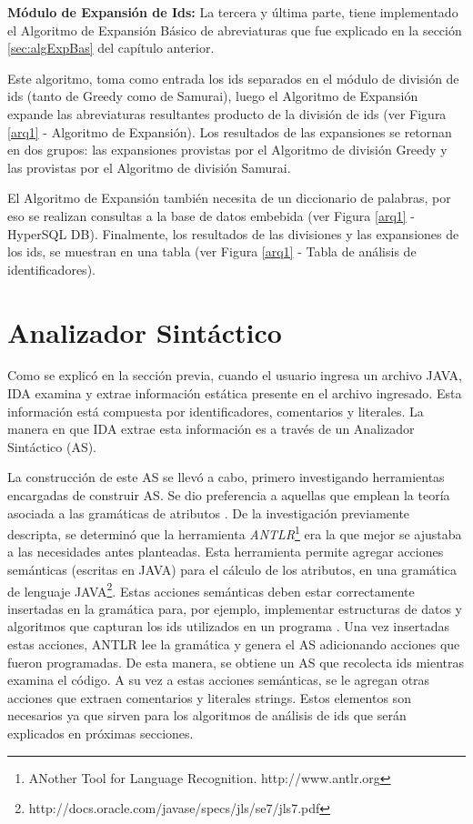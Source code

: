 \textbf{Módulo de Expansión de Ids:} La tercera y última parte, tiene implementado el Algoritmo de Expansión Básico de abreviaturas que fue explicado en la sección \ref{sec:algExpBas} del capítulo anterior. 

Este algoritmo, toma como entrada los ids separados en el módulo de división de ids (tanto de Greedy como de Samurai), luego el Algoritmo de Expansión expande las abreviaturas resultantes producto de la división de ids (ver Figura \ref{arq1} - Algoritmo de Expansión). Los resultados de las expansiones se retornan en dos grupos: las expansiones provistas por el Algoritmo de división Greedy y las provistas por el Algoritmo de división Samurai.


El \mbox{Algoritmo} de Expansión también necesita de un diccionario de palabras, por eso se realizan consultas a la base de datos embebida (ver Figura \ref{arq1} - HyperSQL DB). Finalmente, los resultados de las divisiones y las expansiones de los ids, se muestran en una tabla (ver Figura \ref{arq1} - Tabla de análisis de identificadores).

\section{Analizador Sintáctico}

Como se explicó en la sección previa, cuando el usuario ingresa un archivo JAVA, IDA examina y extrae información estática presente en el archivo ingresado. Esta información está compuesta por identificadores, comentarios y literales. La manera en que IDA extrae esta información es a través de un Analizador Sintáctico (AS).

La construcción de este AS se llevó a cabo, primero investigando herramientas encargadas de construir AS. Se dio preferencia a aquellas que emplean la teoría asociada a las gramáticas de atributos \cite{AHUL06}. De la investigación previamente descripta, se determinó que la herramienta \textit{ANTLR}\footnote[1]{ANother Tool for Language Recognition. http://www.antlr.org} era la que mejor se ajustaba a las necesidades antes planteadas. 
Esta herramienta permite agregar acciones semánticas (escritas en JAVA) para el cálculo de los atributos, en una gramática de lenguaje JAVA\footnote[2]{http://docs.oracle.com/javase/specs/jls/se7/jls7.pdf}. Estas acciones semánticas deben estar correctamente insertadas en la gramática para, por ejemplo, implementar estructuras de datos y algoritmos que capturan los ids utilizados en un programa \cite{AAJU83}. Una vez insertadas estas acciones, ANTLR lee la gramática y genera el AS adicionando acciones que fueron programadas. De esta manera, se obtiene un AS que recolecta ids mientras examina el código. A su vez a estas acciones semánticas, se le agregan otras acciones que extraen comentarios y literales strings. Estos elementos son necesarios ya que sirven para los algoritmos de análisis de ids que serán explicados en próximas secciones.

